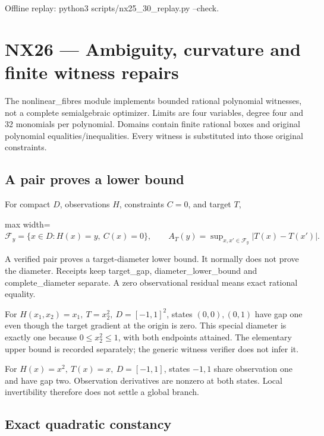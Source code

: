 \documentclass[
  11pt,
  a4paper,
]{report}
\begin{document}
Offline replay: python3 scripts/nx25\_30\_replay.py --check.

\hypertarget{nx26-ambiguity-curvature-and-finite-witness-repairs}{%
\chapter{NX26 --- Ambiguity, curvature and finite witness
repairs}\label{nx26-ambiguity-curvature-and-finite-witness-repairs}}

The nonlinear\_fibres module implements bounded rational polynomial
witnesses, not a complete semialgebraic optimizer. Limits are four
variables, degree four and 32 monomials per polynomial. Domains contain
finite rational boxes and original polynomial equalities/inequalities.
Every witness is substituted into those original constraints.

\hypertarget{a-pair-proves-a-lower-bound}{%
\section{A pair proves a lower
bound}\label{a-pair-proves-a-lower-bound}}

For compact \(D\), observations \(H\), constraints \(C=0\), and target
\(T\), \begin{center}
\begin{adjustbox}{max width=\linewidth}
$\displaystyle
\mathcal F_y=\{x\in D:H(x)=y,\ C(x)=0\},\qquad
A_T(y)=\sup_{x,x'\in\mathcal F_y}|T(x)-T(x')|.
$
\end{adjustbox}
\end{center} A verified pair proves a target-diameter lower bound. It normally
does not prove the diameter. Receipts keep target\_gap,
diameter\_lower\_bound and complete\_diameter separate. A zero
observational residual means exact rational equality.

For \(H(x_1,x_2)=x_1,\ T=x_2^2,\ D=[-1,1]^2\), states \((0,0),(0,1)\)
have gap one even though the target gradient at the origin is zero. This
special diameter is exactly one because \(0\le x_2^2\le1\), with both
endpoints attained. The elementary upper bound is recorded separately;
the generic witness verifier does not infer it.

For \(H(x)=x^2,\ T(x)=x,\ D=[-1,1]\), states \(-1,1\) share observation
one and have gap two. Observation derivatives are nonzero at both
states. Local invertibility therefore does not settle a global branch.

\hypertarget{exact-quadratic-constancy}{%
\section{Exact quadratic constancy}\label{exact-quadratic-constancy}}
\end{document}
